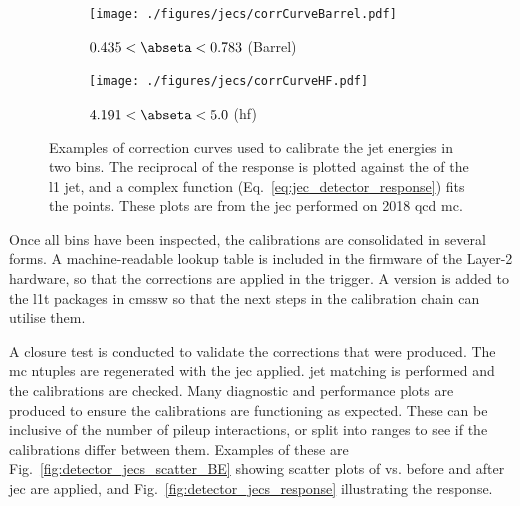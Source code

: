 \begin{figure}[htbp]
    \centering
    \begin{subfigure}[b]{0.45\textwidth}
        \texttt{[image: ./figures/jecs/corrCurveBarrel.pdf]}
        \caption{$\text{0.435} < \abseta < \text{0.783}$ (Barrel)}
        \label{fig:detector_jecs_corr_curve_Barrel}
    \end{subfigure}
    \hfill
    \begin{subfigure}[b]{0.45\textwidth}
        \texttt{[image: ./figures/jecs/corrCurveHF.pdf]}
        \caption{$\text{4.191} < \abseta < \text{5.0}$ (\acrshort{hf})}
        \label{fig:detector_jecs_corr_curve_HF}
    \end{subfigure}
\caption[Examples of correction curves used to calibrate the jet energies in two \abseta bins]{Examples of correction curves used to calibrate the \gls{jet} energies in two \abseta bins. The reciprocal of the response is plotted against the \pt of the \acrlong{l1} \gls{jet}, and a complex function (Eq.~\ref{eq:jec_detector_response}) fits the points. These plots are from the \acrlong{jec} performed on 2018 \acrshort{qcd} \acrlong{mc}.}
\label{fig:detector_jecs_corr_curves}
\end{figure}

Once all \abseta bins have been inspected, the calibrations are consolidated in several forms. A machine-readable lookup table is included in the firmware of the Layer-2 hardware, so that the corrections are applied in the trigger. A version is added to the \acrlong{l1t} packages in \acrshort{cmssw} so that the next steps in the calibration chain can utilise them.

A closure test is conducted to validate the corrections that were produced. The \acrshort{mc} ntuples are regenerated with the \acrshort{jec} applied. \Gls{jet} matching is performed and the calibrations are checked. Many diagnostic and performance plots are produced to ensure the calibrations are functioning as expected. These can be inclusive of the number of \gls{pileup} interactions, or split into ranges to see if the calibrations differ between them. Examples of these are Fig.~\ref{fig:detector_jecs_scatter_BE} showing scatter plots of \ptRef vs. \ptLOne before and after \acrshort{jec} are applied, and Fig.~\ref{fig:detector_jecs_response} illustrating the response.

